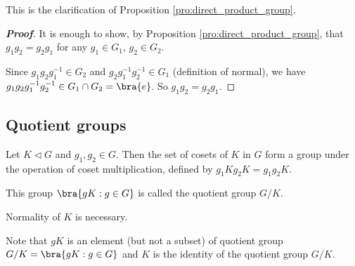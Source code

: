 \begin{remark}
This is the clarification of Proposition \ref{pro:direct_product_group}.
\end{remark}


\begin{proof}[\bf Proof]
It is enough to show, by Proposition \ref{pro:direct_product_group}, that $g_1g_2 = g_2 g_1$ for any $g_1 \in G_1$, $g_2 \in G_2$.

Since $g_1g_2g_1^{-1}\in G_2$ and $g_2g_1^{-1}g_2^{-1}\in G_1$ (definition of normal), we have $g_1g_2g_1^{-1}g_2^{-1} \in G_1\cap G_2 = \bra{e}$. So $g_1g_2 = g_2 g_1$.
\end{proof}



\subsection{Quotient groups}

\begin{theorem}\label{thm:quotient_group}
Let $K \lhd G$ and $g_1,g_2\in G$. Then the set of cosets of $K$ in $G$ form a group under the operation of coset multiplication, defined by $g_1Kg_2K = g_1g_2K$.

This group $\bra{gK:g\in G}$ is called the quotient group $G/K$.%
\end{theorem}

\begin{remark}
Normality of $K$ is necessary.

Note that $gK$ is an element (but not a subset) of quotient group $G/K = \bra{gK:g\in G}$ and $K$ is the identity of the quotient group $G/K$.

\end{remark}

